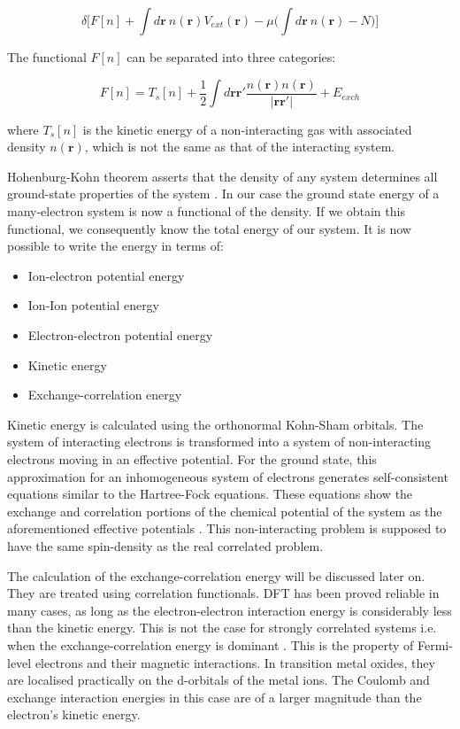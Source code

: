 \documentclass[10pt]{article}
\begin{document}
\begin{equation}
	\delta\biggr[F[n]+\int d\mathbf{r} \ n(\mathbf{r})V_{ext}(\mathbf{r}) - \mu\biggr(\int d\mathbf{r} \ n(\mathbf{r}) - N\biggr)\biggr]
\end{equation}

The functional $F[n]$ can be separated into three categories:

\begin{equation*}
	F[n] = T_s[n]+\frac{1}{2}\int d\mathbf{r}\mathbf{r}'\frac{n(\mathbf{r})n(\mathbf{r})}{|\mathbf{r}\mathbf{r}'|}+E_{exch}
\end{equation*}

where $T_s[n]$ is the kinetic energy of a non-interacting gas with associated density $n(\mathbf{r})$, which is not the same as that of the interacting system.


Hohenburg-Kohn theorem asserts that the density of any system determines all ground-state properties of the system \cite{hohenberg1964density}. In our case the ground state energy of a many-electron system is now a functional of the density. If we obtain this functional, we consequently know the total energy of our system. It is now possible to write the energy in terms of:

\begin{itemize}
	\item Ion-electron potential energy
	\item Ion-Ion potential energy
	\item Electron-electron potential energy
	\item Kinetic energy
	\item Exchange-correlation energy
\end{itemize}

Kinetic energy is calculated using the orthonormal Kohn-Sham orbitals. The system of interacting electrons is transformed into a system of non-interacting electrons moving in an effective potential. For the ground state, this approximation for an inhomogeneous system of electrons generates self-consistent equations similar to the Hartree-Fock equations. These equations show the exchange and correlation portions of the chemical potential of the system as the aforementioned effective potentials \cite{kohn1965self}. This non-interacting problem is supposed to have the same spin-density as the real correlated problem.

The calculation of the exchange-correlation energy will be discussed later on. They are treated using correlation functionals. DFT has been proved reliable in many cases, as long as the electron-electron interaction energy is considerably less than the kinetic energy. This is not the case for strongly correlated systems i.e. when the exchange-correlation energy is dominant \cite{pickett1989electronic}. This is the property of Fermi-level electrons and their magnetic interactions. In transition metal oxides, they are localised practically on the d-orbitals of the metal ions. The Coulomb and exchange interaction energies in this case are of a larger magnitude than the electron's kinetic energy.
\end{document}
